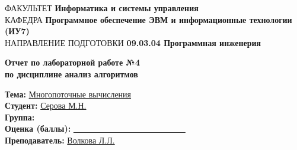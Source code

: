 \begin{titlepage}
	{\doublespacing \small \raggedright ФАКУЛЬТЕТ \hspace{2mm} \textbf{Информатика и системы управления}\\
		КАФЕДРА \hspace{2mm} \textbf{Программное обеспечение ЭВМ и информационные технологии (ИУ7)}\\
		НАПРАВЛЕНИЕ ПОДГОТОВКИ \hspace{2mm} \textbf{09.03.04 Программная инженерия}\\}
	
	
	\vspace{30mm}
	
	\begin{center}
			\centering
			\Large\textbf{  Отчет по лабораторной работе №4}\\
			\textbf{по дисциплине анализ алгоритмов}\\
	\end{center}
	\vspace{20mm}

	
	{\doublespacing\raggedright
		\textbf{Тема:} \hspace{27mm}\underline{Многопоточные вычисления}\\
		\textbf{Студент:} \hspace{17mm} \underline{Серова М.Н.}\\
		\textbf{Группа:} \hspace{21mm}\underline{}\\
		\textbf{Оценка (баллы):} \underline{~~~~~~~~~~~~~~~~~~~~~~~~~~~}\\
	\textbf{Преподаватель:} \hspace{2mm}\underline{Волкова Л.Л.}\\}
	


\end{titlepage}
